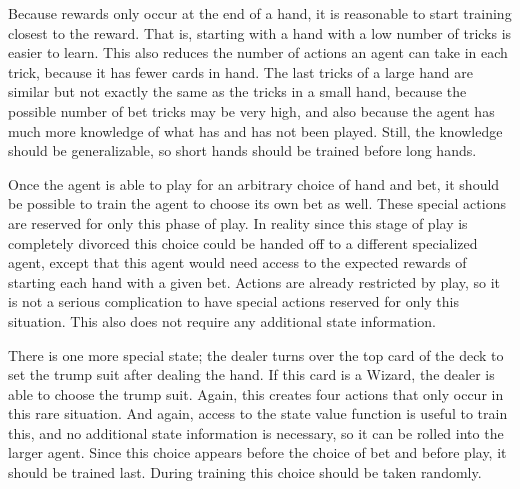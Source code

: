 \documentclass[10pt]{article} %
\begin{document}
Because rewards only occur at the end of a hand, it is reasonable to start training closest to the reward. That is, starting with a hand with a low number of tricks is easier to learn. This also reduces the number of actions an agent can take in each trick, because it has fewer cards in hand. The last tricks of a large hand are similar but not exactly the same as the tricks in a small hand, because the possible number of bet tricks may be very high, and also because the agent has much more knowledge of what has and has not been played. Still, the knowledge should be generalizable, so short hands should be trained before long hands.

Once the agent is able to play for an arbitrary choice of hand and bet, it should be possible to train the agent to choose its own bet as well. These special actions are reserved for only this phase of play. In reality since this stage of play is completely divorced this choice could be handed off to a different specialized agent, except that this agent would need access to the expected rewards of starting each hand with a given bet. Actions are already restricted by play, so it is not a serious complication to have special actions reserved for only this situation. This also does not require any additional state information.

There is one more special state; the dealer turns over the top card of the deck to set the trump suit after dealing the hand. If this card is a Wizard, the dealer is able to choose the trump suit. Again, this creates four actions that only occur in this rare situation. And again, access to the state value function is useful to train this, and no additional state information is necessary, so it can be rolled into the larger agent. Since this choice appears before the choice of bet and before play, it should be trained last. During training this choice should be taken randomly.
\end{document}

